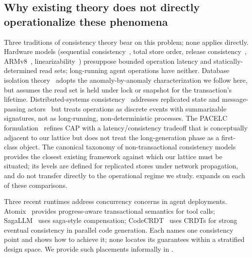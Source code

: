 \documentclass[journal,compsoc,10pt]{IEEEtran}
\providecommand{\citep}{\cite}
\theoremstyle{definition}
\theoremstyle{remark}
\begin{document}
\subsection{Why existing theory does not directly operationalize these phenomena}
\label{sec:why-classical-fails}
Three traditions of consistency theory bear on this problem; none
applies directly. Hardware models (sequential
consistency~\citep{Lamport1979SC}, total store order, release
consistency~\citep{GharachorlooEtAl1990},
ARMv8~\citep{PulteEtAl2018ARMv8},
linearizability~\citep{HerlihyWing1990}) presuppose bounded operation
latency and statically-determined read sets; long-running agent
operations have neither. Database isolation
theory~\citep{BerensonEtAl1995,Adya1999,AdyaLiskovOneil2000} adopts
the anomaly-by-anomaly characterization we follow here, but assumes
the read set is held under lock or snapshot for the transaction's
lifetime. Distributed-systems
consistency~\citep{LloydEtAl2011COPS,MahajanEtAl2011,Burckhardt2014,ShapiroEtAl2011CRDT,TerryEtAl1994}
addresses replicated state and message-passing
actors~\citep{Hewitt1973} but treats operations as discrete events
with summarizable signatures, not as long-running, non-deterministic
processes. The PACELC
formulation~\citep{Abadi2012PACELC} refines CAP with a latency/consistency
tradeoff that is conceptually adjacent to our lattice but does not
treat the long-generation phase as a first-class object. The canonical
taxonomy of non-transactional consistency
models~\citep{ViottiVukolic2016Consistency} provides the closest
existing framework against which our lattice must be situated; its
levels are defined for replicated stores under network propagation,
and do not transfer directly to the operational regime we study.
 expands on each of these comparisons.

Three recent runtimes address concurrency concerns in agent
deployments. Atomix~\citep{MohammadiEtAl2026Atomix} provides
progress-aware transactional semantics for tool calls;
SagaLLM~\citep{GengChang2025SagaLLM} uses saga-style compensation;
CodeCRDT~\citep{Pugachev2025CodeCRDT} uses CRDTs for strong eventual
consistency in parallel code generation. Each names one consistency
point and shows how to achieve it; none locates its guarantees within
a stratified design space. We provide such placements informally in
.
\end{document}
